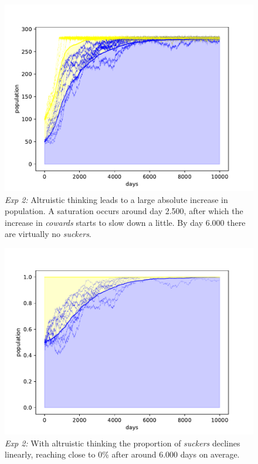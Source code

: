 \documentclass[sigconf]{acmart}
\newcommand{\cowards}{\textit{cowards}\xspace}
\newcommand{\suckers}{\textit{suckers}\xspace}
\begin{document}
    \begin{figure}[hbt!]
        \includegraphics[width=\columnwidth]{figures/exp2_sucker}
        \caption{\textit{Exp 2:} Altruistic thinking leads to a large absolute increase in population.
        A saturation occurs around day 2.500, after which the increase in \cowards starts to slow down a little.
        By day 6.000 there are virtually no \suckers.}
        \label{fig:exp2_sucker}
    \end{figure}

    \begin{figure}[t]
        \includegraphics[width=\columnwidth]{figures/exp2_sucker_rel}
        \caption{\textit{Exp 2:} With altruistic thinking the proportion of \suckers declines linearly, reaching close to 0\% after around 6.000 days on average.}
        \label{fig:exp2_sucker_rel}
    \end{figure}
\end{document}
